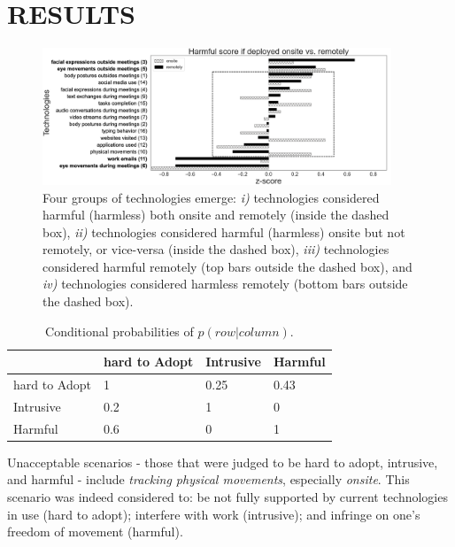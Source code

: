 \section{RESULTS}
\label{sec:results}

\begin{figure}
    \centering
    \includegraphics[width=0.93\textwidth]{figures/harm_tech_v4.png}
    \caption{Four groups of technologies emerge: \emph{i)} technologies considered harmful (harmless) both onsite and remotely (inside the dashed box), \emph{ii)} technologies considered harmful (harmless) onsite but not remotely, or vice-versa (inside the dashed box), \emph{iii)} technologies considered harmful remotely (top bars outside the dashed box), and \emph{iv)} technologies considered harmless remotely (bottom bars outside the dashed box).
    }
    \label{fig:harmful_quadrant}
\end{figure}

\begin{table}[t]
    \centering
    \caption{Conditional probabilities of $p(row | column)$.}
    \begin{tabular}{|l l l l|}
        \hline
        & hard to Adopt & Intrusive & Harmful \\  \hline
        hard to Adopt & 1             & 0.25      & 0.43    \\
        Intrusive     & 0.2           & 1         & 0       \\
        Harmful       & 0.6           & 0         & 1       \\
        \hline
    \end{tabular}
    \label{tab:probs}
\end{table}

Unacceptable scenarios - those that were judged to be hard to adopt, intrusive, and harmful - include \emph{tracking physical movements}, especially \emph{onsite}. This scenario was indeed considered to: be not fully supported by current technologies in use (hard to adopt); interfere with work (intrusive); and infringe on one's freedom of movement (harmful).

